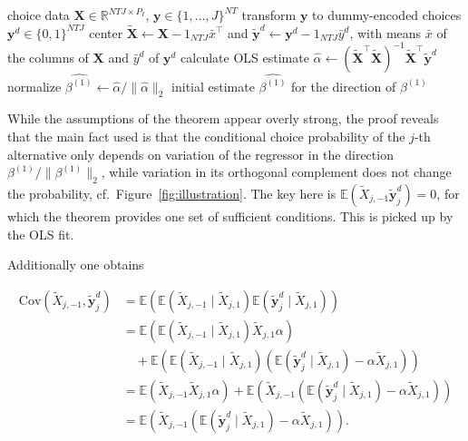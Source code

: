 \documentclass[preprint,12pt,authoryear]{elsarticle}
\newcommand{\R}{\mathbb{R}}
\newcommand{\E}{\mathbb{E}}
\newcommand{\Cov}{\text{Cov}}
\newcommand{\norm}[1]{\ensuremath{\lVert #1\rVert_2}}
\begin{document}
\begin{algorithm}[htbp]
    \caption{Initial estimates for type-I coefficients.}
    \label{alg:type1init}
    \begin{algorithmic}[1]
        \REQUIRE choice data $\bm{X} \in \R^{NTJ \times P_I}$, $\bm{y} \in \{1,\dots,J\}^{NT}$
        \STATE transform $\bm{y}$ to dummy-encoded choices $\bm{y}^d \in \{0,1\}^{NTJ}$
        \STATE center $\tilde{\bm{X}} \leftarrow \bm{X} - 1_{NTJ} \bar{x}^\top$ and $\tilde{\bm{y}}^d \leftarrow \bm{y}^d - 1_{NTJ} \bar{y}^d$, with means $\bar{x}$ of the columns of $\bm{X}$ and $\bar{y}^d$ of $\bm{y}^d$
        \STATE calculate OLS estimate $\hat{\alpha} \leftarrow (\tilde{\bm{X}}^\top \tilde{\bm{X}})^{-1} \tilde{\bm{X}}^\top \tilde{\bm{y}}^d$
        \STATE normalize $\widehat{\beta^{(1)}} \leftarrow \hat{\alpha} / \norm{\hat{\alpha}}$
        \ENSURE initial estimate $\widehat{\beta^{(1)}}$ for the direction of $\beta^{(1)}$
    \end{algorithmic}
\end{algorithm}

While the assumptions of the theorem appear overly strong, the proof
reveals that the main fact used is that the conditional choice probability
of the $j$-th alternative only depends on variation of the regressor in
the direction $\beta^{(1)}/ \norm{\beta^{(1)}}$, while variation in its orthogonal complement
does not change the probability, cf.\ Figure~\ref{fig:illustration}.
The key here is $\E\left( \tilde X_{j,-1}\tilde{\bm{y}}^d_{j} \right) = 0$, for which the theorem provides one set of sufficient conditions.
This is picked up by the OLS fit.

Additionally one obtains

\begin{align*}
\Cov(\tilde X_{j,-1},\tilde{\bm{y}}^d_{j}) &= \E\left(\E(\tilde X_{j,-1} \mid \tilde{X}_{j,1}) \E(\tilde{\bm{y}}^d_{j} \mid \tilde{X}_{j,1})\right) \\
&= \E\left(\E(\tilde X_{j,-1} \mid \tilde{X}_{j,1})  \tilde X_{j,1} \alpha  \right) \\
&\quad + \E\left(\E(\tilde X_{j,-1} \mid \tilde{X}_{j,1}) (\E(\tilde{\bm{y}}^d_{j}  \mid \tilde{X}_{j,1}) - \alpha \tilde X_{j,1}) \right) \\
&= \E\left(\tilde X_{j,-1} \tilde X_{j,1} \alpha  \right)
+ \E\left(\tilde X_{j,-1} (\E(\tilde{\bm{y}}^d_{j}  \mid \tilde{X}_{j,1}) - \alpha \tilde X_{j,1}) \right) \\
&= \E\left(\tilde X_{j,-1} (\E(\tilde{\bm{y}}^d_{j}  \mid \tilde{X}_{j,1}) - \alpha \tilde X_{j,1}) \right).
\end{align*}
\end{document}
